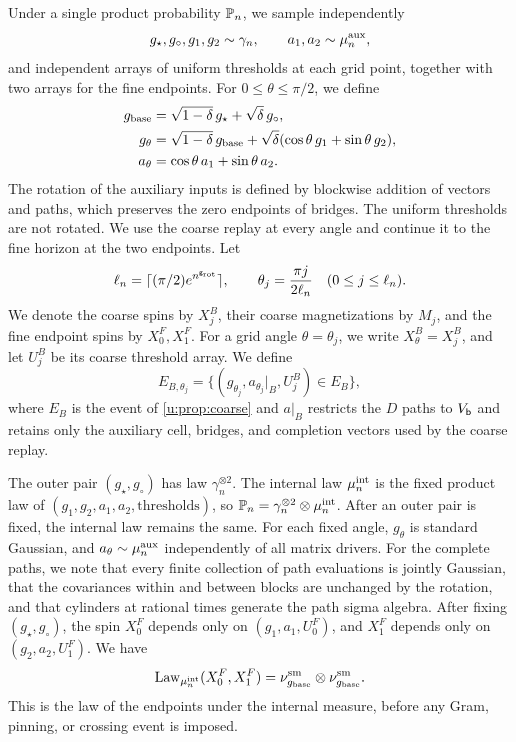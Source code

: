 Under a single product probability $\mathbb P_n$, we sample independently
\[
 g_\star,g_\circ,g_1,g_2\sim\gamma_n,\qquad
 a_1,a_2\sim\mu^{\rm aux}_n,
\]
and independent arrays of uniform thresholds at each grid point, together
with two arrays for the fine endpoints. For $0\le\theta\le\pi/2$, we define
\begin{equation}\label{u:eq:coupled-rotation}
 \begin{split}
 g_{\rm base}&=\sqrt{1-\delta}\,g_\star+\sqrt\delta\,g_\circ,\\
 g_\theta&=\sqrt{1-\delta}\,g_{\rm base}
                +\sqrt\delta(\cos\theta\,g_1+\sin\theta\,g_2),\\
 a_\theta&=\cos\theta\,a_1+\sin\theta\,a_2.
 \end{split}
\end{equation}
The rotation of the auxiliary inputs is defined by blockwise addition of
vectors and paths, which preserves the zero endpoints of bridges. The uniform thresholds are not
rotated. We use the coarse replay at every angle and continue it to the fine
horizon at the two endpoints. Let
\[
 \ell_n=\lceil(\pi/2)e^{n^{\mathsf{g}_{\rm rot}}}\rceil,
 \qquad \theta_j=\frac{\pi j}{2\ell_n}\quad(0\le j\le\ell_n).
\]
We denote the coarse spins by $X_j^B$, their coarse magnetizations by
$M_j$, and the fine endpoint spins by $X_0^F,X_1^F$.
For a grid angle $\theta=\theta_j$, we write $X_\theta^B=X_j^B$,
and let $U_j^B$ be its coarse threshold array. We define
\[
 E_{B,\theta_j}
   =\{(g_{\theta_j},a_{\theta_j}|_B,U_j^B)\in E_B\},
\]
where $E_B$ is the event of \cref{u:prop:coarse} and
$a|_B$ restricts the $D$ paths to $V_{\mathsf{b}}$ and retains only
the auxiliary cell, bridges, and completion vectors used by the
coarse replay.

The outer pair $(g_\star,g_\circ)$ has law $\gamma_n^{\otimes2}$.
The internal law $\mu^{\rm int}_n$ is the fixed product law of
$(g_1,g_2,a_1,a_2,\text{thresholds})$, so
$\mathbb P_n=\gamma_n^{\otimes2}\otimes\mu^{\rm int}_n$. After an outer pair is
fixed, the internal law remains the same. For each fixed angle,
$g_\theta$ is standard Gaussian, and $a_\theta\sim\mu^{\rm aux}_n$
independently of all matrix drivers. For the complete paths, we note that every finite collection of path
evaluations is jointly Gaussian, that the covariances within and
between blocks are unchanged by the rotation, and that cylinders at
rational times generate the path sigma algebra. After fixing $(g_\star,g_\circ)$, the spin $X_0^F$ depends only on
$(g_1,a_1,U_0^F)$, and $X_1^F$ depends only on $(g_2,a_2,U_1^F)$. We have
\begin{equation}\label{u:eq:endpoint-product-law}
 \operatorname{Law}_{\mu^{\rm int}_n}(X_0^F,X_1^F)
        =\nu^{\rm sm}_{g_{\rm base}}\otimes\nu^{\rm sm}_{g_{\rm base}}.
\end{equation}
This is the law of the endpoints under the internal measure, before any
Gram, pinning, or crossing event is imposed.

